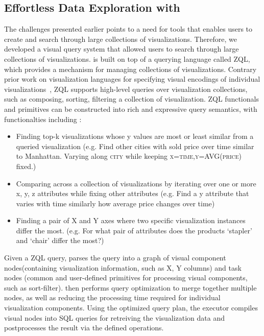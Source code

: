\subsection{Effortless Data Exploration with \zv}
\par The challenges presented earlier points to a need for tools that enables users to create and search through large collections of visualizations. Therefore, we developed \zv a visual query system that allowed users to search through large collections of visualizations. \zv is built on top of a querying language called ZQL, which provides a mechanism for managing collections of visualizations\cite{Siddiqui}. Contrary prior work on visualization languages for specifying visual encodings of individual visualizations~\cite{Stolte2002,Wilkinson2005}, ZQL supports high-level queries over visualization collections, such as composing, sorting, filtering a collection of visualization. ZQL functionals and primitives can be constructed into rich and expressive query semantics, with functionalties including : 
\begin{itemize}
	\item Finding top-k visualizations whose y values are most or least similar from a queried visualization (e.g. Find other cities with sold price over time similar to Manhattan. Varying along \textsc{city} while keeping \textsc{x=time,y=AVG(price)} fixed.) 
	\item Comparing across a collection of visualizations by iterating over one or more x, y, z attributes while fixing other attributes (e.g. Find a y attribute that varies with time similarly how average price changes over time)
	\item Finding a pair of X and Y axes where two specific visualization instances differ the most. (e.g. For what pair of attributes does the products `stapler' and `chair' differ the most?)
\end{itemize}
\par Given a ZQL query, \zv parses the query into a graph of visual component nodes(containing visualization information, such as X, Y columns) and task nodes (common and user-defined primitives for processing visual components, such as sort-filter). \zv then performs query optimization to merge together multiple nodes, as well as reducing the processing time required for individual visualization components. Using the optimized query plan, the executor compiles visual nodes into SQL queries for retreiving the visualization data and postprocesses the result via the defined operations. 
